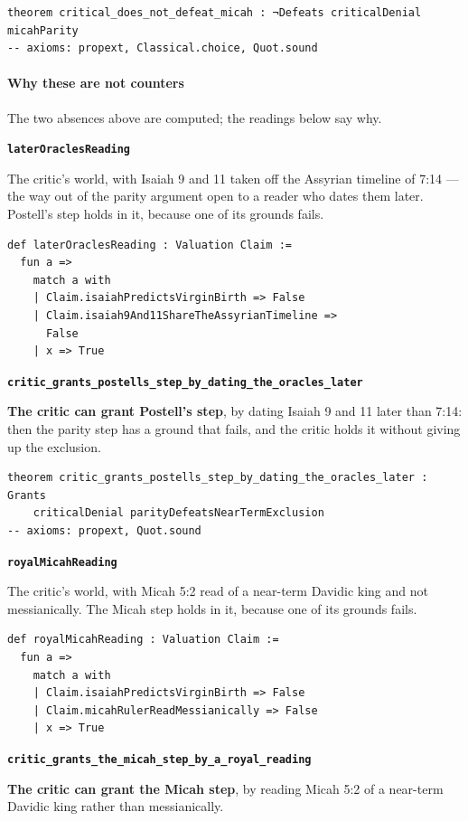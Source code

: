 \documentclass[11pt]{article}
\begin{document}
{\small\begin{verbatim}
theorem critical_does_not_defeat_micah : ¬Defeats criticalDenial micahParity
-- axioms: propext, Classical.choice, Quot.sound
\end{verbatim}}
\paragraph*{Why these are not counters}
\leavevmode\par
The two absences above are computed; the readings below say why.

\par\medskip\noindent\textbf{\texttt{later\allowbreak{}Oracles\allowbreak{}Reading}}\par\nobreak\noindent
The critic's world, with Isaiah 9 and 11 taken off the Assyrian timeline of 7:14 — the way out of the parity argument open to a reader who dates them later. Postell's step holds in it, because one of its grounds fails.

{\small\begin{verbatim}
def laterOraclesReading : Valuation Claim :=
  fun a =>
    match a with
    | Claim.isaiahPredictsVirginBirth => False
    | Claim.isaiah9And11ShareTheAssyrianTimeline =>
      False
    | x => True
\end{verbatim}}
\par\medskip\noindent\textbf{\texttt{critic\_\allowbreak{}grants\_\allowbreak{}postells\_\allowbreak{}step\_\allowbreak{}by\_\allowbreak{}dating\_\allowbreak{}the\_\allowbreak{}oracles\_\allowbreak{}later}}\par\nobreak\noindent
\textbf{The critic can grant Postell's step}, by dating Isaiah 9 and 11 later than 7:14: then the parity step has a ground that fails, and the critic holds it without giving up the exclusion.

{\small\begin{verbatim}
theorem critic_grants_postells_step_by_dating_the_oracles_later : Grants
    criticalDenial parityDefeatsNearTermExclusion
-- axioms: propext, Quot.sound
\end{verbatim}}
\par\medskip\noindent\textbf{\texttt{royal\allowbreak{}Micah\allowbreak{}Reading}}\par\nobreak\noindent
The critic's world, with Micah 5:2 read of a near-term Davidic king and not messianically. The Micah step holds in it, because one of its grounds fails.

{\small\begin{verbatim}
def royalMicahReading : Valuation Claim :=
  fun a =>
    match a with
    | Claim.isaiahPredictsVirginBirth => False
    | Claim.micahRulerReadMessianically => False
    | x => True
\end{verbatim}}
\par\medskip\noindent\textbf{\texttt{critic\_\allowbreak{}grants\_\allowbreak{}the\_\allowbreak{}micah\_\allowbreak{}step\_\allowbreak{}by\_\allowbreak{}a\_\allowbreak{}royal\_\allowbreak{}reading}}\par\nobreak\noindent
\textbf{The critic can grant the Micah step}, by reading Micah 5:2 of a near-term Davidic king rather than messianically.
\end{document}
